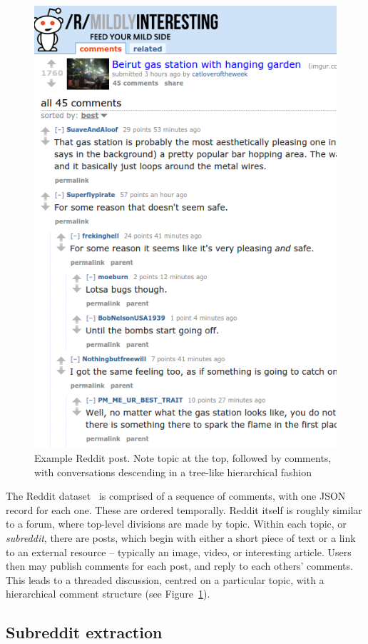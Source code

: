 \documentclass[10pt,journal,compsoc]{IEEEtran}
\begin{document}
\begin{figure}
\centering
\includegraphics[width=0.7\columnwidth]{reddit-example.png}
\caption{Example Reddit post. Note topic at the top, followed by comments, with conversations descending in a tree-like hierarchical fashion}
\label{fig:reddit-example}
\end{figure}

The Reddit dataset~\cite{reddit-data} is comprised of a sequence of comments, with one JSON record for each one.
These are ordered temporally.
Reddit itself is roughly similar to a forum, where top-level divisions are made by topic.
Within each topic, or {\em subreddit}, there are posts, which begin with either a short piece of text or a link to an external resource -- typically an image, video, or interesting article.
Users then may publish comments for each post, and reply to each others' comments.
This leads to a threaded discussion, centred on a particular topic, with a hierarchical comment structure (see Figure~\ref{fig:reddit-example}).


\subsection{Subreddit extraction}
\end{document}
